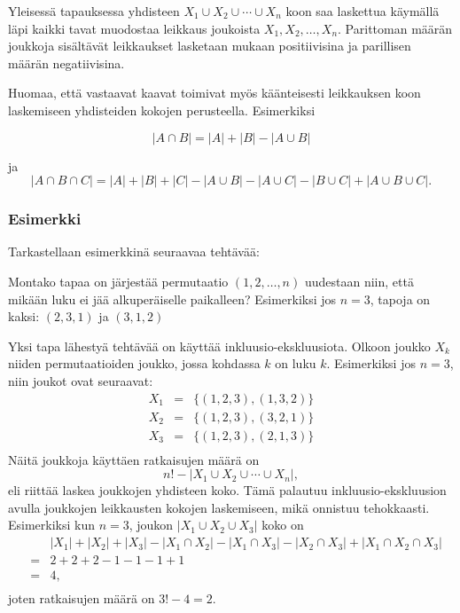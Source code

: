 Yleisessä tapauksessa yhdisteen $X_1 \cup X_2 \cup \cdots \cup X_n$
koon saa laskettua käymällä läpi kaikki tavat muodostaa
leikkaus joukoista $X_1,X_2,\ldots,X_n$.
Parittoman määrän joukkoja sisältävät leikkaukset
lasketaan mukaan positiivisina ja
parillisen määrän negatiivisina.

Huomaa, että vastaavat kaavat toimivat myös käänteisesti
leikkauksen koon laskemiseen yhdisteiden kokojen perusteella.
Esimerkiksi

\[ |A \cap B| = |A| + |B| - |A \cup B|\]

ja
\[ |A \cap B \cap C| = |A| + |B| + |C| - |A \cup B|  - |A \cup C|  - |B \cup C| + |A \cup B \cup C| .\]

\subsubsection{Esimerkki}

Tarkastellaan esimerkkinä seuraavaa tehtävää:

\begin{task}
Montako tapaa on järjestää permutaatio
$(1,2,\ldots,n)$ uudestaan niin,
että mikään luku ei jää alkuperäiselle paikalleen?
Esimerkiksi jos $n=3$, tapoja on kaksi: $(2,3,1)$ ja $(3,1,2)$
\end{task}

Yksi tapa lähestyä tehtävää on käyttää inkluusio-ekskluusiota.
Olkoon joukko $X_k$ niiden permutaatioiden joukko,
jossa kohdassa $k$ on luku $k$.
Esimerkiksi jos $n=3$, niin joukot ovat seuraavat:
\[
\begin{array}{lcl}
X_1 & = & \{(1,2,3),(1,3,2)\} \\
X_2 & = & \{(1,2,3),(3,2,1)\} \\
X_3 & = & \{(1,2,3),(2,1,3)\} \\
\end{array}
\]
Näitä joukkoja käyttäen ratkaisujen määrä on
\[ n! - |X_1 \cup X_2 \cup \cdots \cup X_n|, \]
eli
riittää laskea joukkojen yhdisteen koko.
Tämä palautuu inkluusio-eks\-kluu\-sion avulla
joukkojen leikkausten kokojen laskemiseen,
mikä onnistuu tehokkaasti.
Esimerkiksi kun $n=3$, joukon $|X_1 \cup X_2 \cup X_3|$ koko on
\[
\begin{array}{lcl}
 & & |X_1| + |X_2| + |X_3| - |X_1 \cap X_2|  - |X_1 \cap X_3|  - |X_2 \cap X_3| + |X_1 \cap X_2 \cap X_3| \\
 & = & 2+2+2-1-1-1+1 \\
 & = & 4, \\
\end{array}
\]
joten ratkaisujen määrä on $3!-4=2$.

